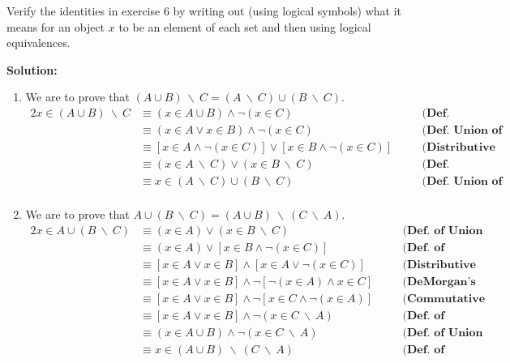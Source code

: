 Verify the identities in exercise 6 by writing out (using logical symbols) what it means for an object $x$ to be an element of each set and then using logical equivalences.

\textbf{Solution:}
\begin{enumerate}[label=(\alph*)]
    \item We are to prove that $(A \cup B) \: \backslash \: C = (A \: \backslash \: C) \cup (B \: \backslash \: C)$.
    \begin{alignat*}{2}
        x \in (A \cup B) \: \backslash \: C &\equiv (x \in A \cup B) \wedge \neg (x \in C) && \quad \textbf{(Def. Difference of Sets)} \\
        &\equiv (x \in A \vee x \in B) \wedge \neg (x \in C) && \quad \textbf{(Def. Union of Sets)}\\
        &\equiv [x \in A \wedge \neg (x \in C)] \vee [x \in B \wedge \neg (x \in C)] && \quad \textbf{(Distributive Law)}\\
        &\equiv (x \in A \: \backslash \: C) \vee (x \in B \: \backslash \: C) && \quad \textbf{(Def. Difference of Sets)}\\
        &\equiv x \in (A \: \backslash \: C) \cup (B \: \backslash \: C) && \quad \textbf{(Def. Union of Sets)}\\
    \end{alignat*}

    \item We are to prove that $A \cup (B \: \backslash \: C) = (A \cup B) \: \backslash \: (C \: \backslash \: A)$.
    \begin{alignat*}{2}
        x \in A \cup (B \: \backslash \: C) &\equiv (x \in A) \vee (x \in B \: \backslash \: C) && \quad \textbf{(Def. of Union of Sets)}\\
        &\equiv (x \in A) \vee [x \in B \wedge \neg (x \in C)] && \quad \textbf{(Def. of Difference of Sets)}\\
        &\equiv [x \in A \vee x \in B] \wedge [x \in A \vee \neg (x \in C)] && \quad \textbf{(Distributive Law)}\\
        &\equiv [x \in A \vee x \in B] \wedge \neg [\neg (x \in A) \wedge x \in C] && \quad \textbf{(DeMorgan's Law)}\\
        &\equiv [x \in A \vee x \in B] \wedge \neg [x \in C \wedge \neg (x \in A)] && \quad \textbf{(Commutative Law)}\\
        &\equiv [x \in A \vee x \in B] \wedge \neg (x \in C \: \backslash \: A) && \quad \textbf{(Def. of Difference of Sets)}\\
        &\equiv (x \in A \cup B) \wedge \neg (x \in C \: \backslash \: A) && \quad \textbf{(Def. of Union of Sets)}\\
        &\equiv x \in (A \cup B) \: \backslash \: (C \: \backslash \: A) && \quad \textbf{(Def. of Difference of Sets)}
    \end{alignat*}
\end{enumerate}
\pagebreak
